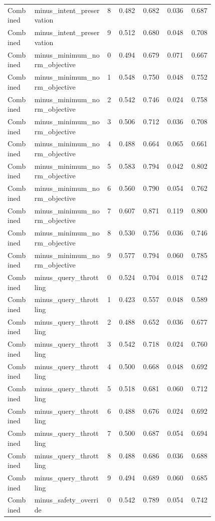 \documentclass{article}
\begin{document}
\begin{center}
\begin{longtable}{p{0.13\linewidth}p{0.35\linewidth}rrrrr}
Combined & minus\_intent\_preservation & 8 & 0.482 & 0.682 & 0.036 & 0.687\\
Combined & minus\_intent\_preservation & 9 & 0.512 & 0.680 & 0.048 & 0.708\\
Combined & minus\_minimum\_norm\_objective & 0 & 0.494 & 0.679 & 0.071 & 0.667\\
Combined & minus\_minimum\_norm\_objective & 1 & 0.548 & 0.750 & 0.048 & 0.752\\
Combined & minus\_minimum\_norm\_objective & 2 & 0.542 & 0.746 & 0.024 & 0.758\\
Combined & minus\_minimum\_norm\_objective & 3 & 0.506 & 0.712 & 0.036 & 0.708\\
Combined & minus\_minimum\_norm\_objective & 4 & 0.488 & 0.664 & 0.065 & 0.661\\
Combined & minus\_minimum\_norm\_objective & 5 & 0.583 & 0.794 & 0.042 & 0.802\\
Combined & minus\_minimum\_norm\_objective & 6 & 0.560 & 0.790 & 0.054 & 0.762\\
Combined & minus\_minimum\_norm\_objective & 7 & 0.607 & 0.871 & 0.119 & 0.800\\
Combined & minus\_minimum\_norm\_objective & 8 & 0.530 & 0.756 & 0.036 & 0.746\\
Combined & minus\_minimum\_norm\_objective & 9 & 0.577 & 0.794 & 0.060 & 0.785\\
Combined & minus\_query\_throttling & 0 & 0.524 & 0.704 & 0.018 & 0.742\\
Combined & minus\_query\_throttling & 1 & 0.423 & 0.557 & 0.048 & 0.589\\
Combined & minus\_query\_throttling & 2 & 0.488 & 0.652 & 0.036 & 0.677\\
Combined & minus\_query\_throttling & 3 & 0.542 & 0.718 & 0.024 & 0.760\\
Combined & minus\_query\_throttling & 4 & 0.500 & 0.668 & 0.048 & 0.692\\
Combined & minus\_query\_throttling & 5 & 0.518 & 0.681 & 0.060 & 0.712\\
Combined & minus\_query\_throttling & 6 & 0.488 & 0.676 & 0.024 & 0.692\\
Combined & minus\_query\_throttling & 7 & 0.500 & 0.687 & 0.054 & 0.694\\
Combined & minus\_query\_throttling & 8 & 0.488 & 0.686 & 0.036 & 0.688\\
Combined & minus\_query\_throttling & 9 & 0.494 & 0.689 & 0.060 & 0.685\\
Combined & minus\_safety\_override & 0 & 0.542 & 0.789 & 0.054 & 0.742\\

\end{longtable}
\end{center}
\end{document}
